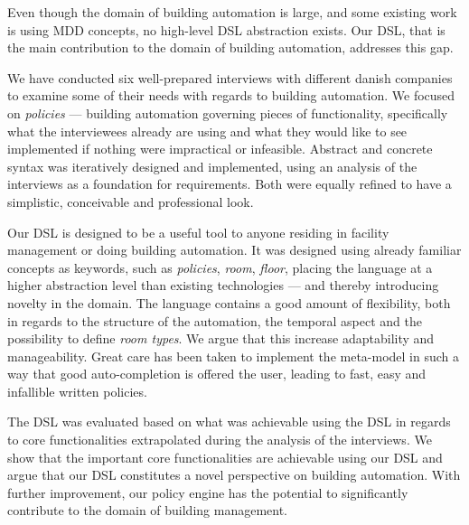 Even though the domain of building automation is large, and some existing work is using MDD concepts, no high-level DSL abstraction exists. Our DSL, that is the main contribution to the domain of building automation, addresses this gap.

We have conducted six well-prepared interviews with different danish companies to examine some of their needs with regards to building automation. We focused on \textit{policies} --- building automation governing pieces of functionality, specifically what the interviewees already are using and what they would like to see implemented if nothing were impractical or infeasible. Abstract and concrete syntax was iteratively designed and implemented, using an analysis of the interviews as a foundation for requirements. Both were equally refined to have a simplistic, conceivable and professional look. 

Our DSL is designed to be a useful tool to anyone residing in facility management or doing building automation. It was designed using already familiar concepts as keywords, such as \textit{policies}, \textit{room}, \textit{floor}, placing the language at a higher abstraction level than existing technologies --- and thereby introducing novelty in the domain. The language contains a good amount of flexibility, both in regards to the structure of the automation, the temporal aspect and the possibility to define \textit{room types}. We argue that this increase adaptability and manageability. Great care has been taken to implement the meta-model in such a way that good auto-completion is offered the user, leading to fast, easy and infallible written policies. 

The DSL was evaluated based on what was achievable using the DSL in regards to core functionalities extrapolated during the analysis of the interviews. We show that the important core functionalities are achievable using our DSL and argue that our DSL constitutes a novel perspective on building automation. With further improvement, our policy engine has the potential to significantly contribute to the domain of building management.